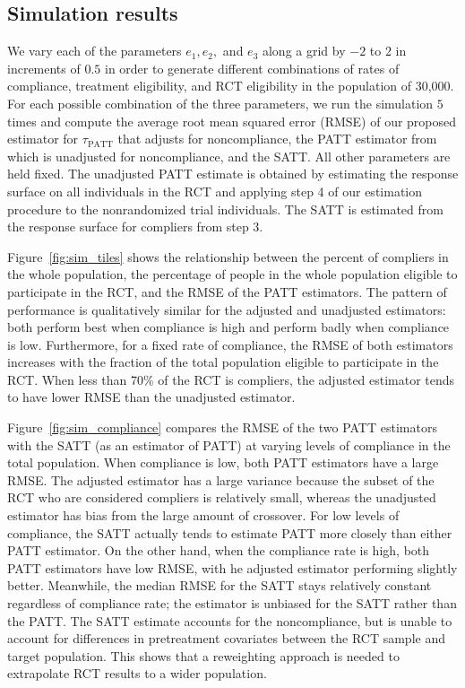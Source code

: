 \documentclass[12pt]{article}
\begin{document}
\subsection{Simulation results}

We vary each of the parameters $e_1, e_2,$ and $e_3$ along a grid by $-2$ to $2$ in increments of $0.5$ in order to generate different combinations of rates of compliance, treatment eligibility, and RCT eligibility in the population of 30,000.  For each possible combination of the three parameters, we run the simulation $5$ times and compute the average root mean squared error (RMSE) of our proposed estimator for $\tau_{\text{PATT}}$ that adjusts for noncompliance, the PATT estimator from \citet{Hartman} which is unadjusted for noncompliance, and the SATT.  All other parameters are held fixed. The unadjusted PATT estimate is obtained by estimating the response surface on all individuals in the RCT and applying step 4 of our estimation procedure to the nonrandomized trial individuals.  The SATT is estimated from the response surface for compliers from step 3.

Figure~\ref{fig:sim_tiles} shows the relationship between the percent of compliers in the whole population, the percentage of people in the whole population eligible to participate in the RCT, and the RMSE of the PATT estimators.  The pattern of performance is qualitatively similar for the adjusted and unadjusted estimators: both perform best when compliance is high and perform badly when compliance is low.  Furthermore, for a fixed rate of compliance, the RMSE of both estimators increases with the fraction of the total population eligible to participate in the RCT. When less than 70\% of the RCT is compliers, the adjusted estimator tends to have lower RMSE than the unadjusted estimator.


Figure~\ref{fig:sim_compliance} compares the RMSE of the two PATT estimators with the SATT (as an estimator of PATT) at varying levels of compliance in the total population.  When compliance is low, both PATT estimators have a large RMSE.  The adjusted estimator has a large variance because the subset of the RCT who are considered compliers is relatively small, whereas the unadjusted estimator has bias from the large amount of crossover.  For low levels of compliance, the SATT actually tends to estimate PATT more closely than either PATT estimator.  On the other hand, when the compliance rate is high, both PATT estimators have low RMSE, with he adjusted estimator performing slightly better.  Meanwhile, the median RMSE for the SATT stays relatively constant regardless of compliance rate; the estimator is unbiased for the SATT rather than the PATT.  The SATT estimate accounts for the noncompliance, but is unable to account for differences in pretreatment covariates between the RCT sample and target population.  This shows that a reweighting approach is needed to extrapolate RCT results to a wider population.
\end{document}
